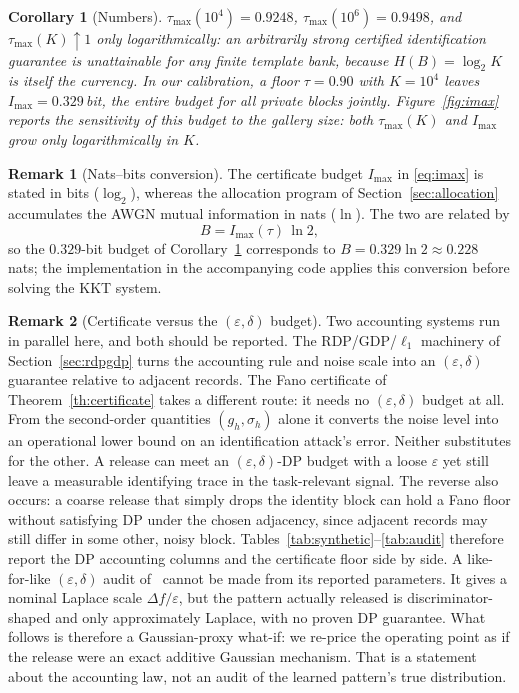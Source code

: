 \documentclass[10pt,twocolumn,letterpaper]{article}
\theoremstyle{plain}
\newtheorem{corollary}{Corollary}
\theoremstyle{definition}
\newtheorem{remark}{Remark}
\begin{document}
\begin{corollary}[Numbers]
\label{co:numbers}
$\tau_{\max}(10^{4})=0.9248$, $\tau_{\max}(10^{6})=0.9498$, and
$\tau_{\max}(K)\uparrow1$ only logarithmically: an arbitrarily strong
\emph{certified} identification guarantee is unattainable for any finite
template bank, because $H(B)=\log_2K$ is itself the currency. In our
calibration, a floor $\tau=0.90$ with $K=10^{4}$ leaves
$I_{\max}=0.329$\,bit, the entire budget for all private blocks jointly.
Figure~\ref{fig:imax} reports the sensitivity of this budget to the gallery
size: both $\tau_{\max}(K)$ and $I_{\max}$ grow only logarithmically in $K$.
\end{corollary}

\begin{remark}[Nats--bits conversion]
\label{rm:units}
The certificate budget $I_{\max}$ in \eqref{eq:imax} is stated in bits
($\log_2$), whereas the allocation program of Section~\ref{sec:allocation}
accumulates the AWGN mutual information in nats ($\ln$). The two are related
by
\begin{equation}
B = I_{\max}(\tau)\,\ln 2,
\label{eq:natsbits}
\end{equation}
so the $0.329$-bit budget of Corollary~\ref{co:numbers} corresponds to
$B=0.329\ln 2\approx0.228$ nats; the implementation in the accompanying code
applies this conversion before solving the KKT system.
\end{remark}

\begin{remark}[Certificate versus the $(\varepsilon,\delta)$ budget]
\label{rm:twosystems}
Two accounting systems run in parallel here, and both should be reported. The
RDP/GDP/$\ell_1$ machinery of Section~\ref{sec:rdpgdp} turns the accounting rule and noise scale into an
$(\varepsilon,\delta)$ guarantee relative to adjacent records. The Fano certificate of Theorem~\ref{th:certificate} takes a
different route: it needs no $(\varepsilon,\delta)$ budget at all. From the second-order quantities $(g_h,\sigma_h)$
alone it converts the noise level into an operational lower bound on an identification
attack's error. Neither substitutes for the other. A release can meet an $(\varepsilon,\delta)$-DP budget
with a loose $\varepsilon$ yet still leave a measurable identifying trace in the task-relevant
signal. The reverse also occurs: a coarse release that simply drops the identity block
can hold a Fano floor without satisfying DP under the chosen adjacency, since adjacent
records may still differ in some other, noisy block. Tables~\ref{tab:synthetic}--\ref{tab:audit} therefore report
the DP accounting columns and the certificate floor side by side. A like-for-like $(\varepsilon,\delta)$
audit of~\cite{arXiv2510} cannot be made from its reported parameters. It gives a nominal Laplace
scale $\Delta f/\varepsilon$, but the pattern actually released is discriminator-shaped and only
approximately Laplace, with no proven DP guarantee. What follows is therefore a
Gaussian-proxy what-if: we re-price the operating point as if the release were an exact
additive Gaussian mechanism. That is a statement about the accounting law, not an audit
of the learned pattern's true distribution.
\end{remark}
\end{document}
